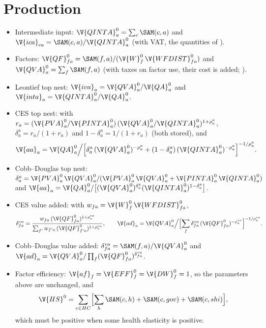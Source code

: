 \section{Production}\label{sec:cal-production}

\begin{itemize}
\item Intermediate input: $\V{QINTA}^0_a = \sum_c \SAM(c, a)$ and
$\V{ica}_{ca} = \SAM(c, a) / \V{QINTA}^0_a$ (with VAT, the quantities of
).
\item Factors: $\V{QF}^0_{fa} = \SAM(f, a) / (\V{W}^0_f\,\V{WFDIST}^0_{fa})$ and
$\V{QVA}^0_a = \sum_f \SAM(f, a)$ (with taxes on factor use, their cost is
added; ).
\item Leontief top nest: $\V{iva}_a = \V{QVA}^0_a / \V{QA}^0_a$ and
$\V{inta}_a = \V{QINTA}^0_a / \V{QA}^0_a$.
\item CES top nest: with
$r_a = (\V{PVA}^0_a / \V{PINTA}^0_a)\,(\V{QVA}^0_a / \V{QINTA}^0_a)^{1 + \rho^a_a}$,
$\delta^a_a = r_a / (1 + r_a)$ and $1 - \delta^a_a = 1/(1 + r_a)$ (both
stored), and
\begin{equation*}
\V{aa}_a = \V{QA}^0_a \Big/ \Bigl[\delta^a_a\,(\V{QVA}^0_a)^{-\rho^a_a} + (1 - \delta^a_a)\,(\V{QINTA}^0_a)^{-\rho^a_a}\Bigr]^{-1/\rho^a_a}.
\end{equation*}
\item Cobb--Douglas top nest:
$\delta^a_a = \V{PVA}^0_a\,\V{QVA}^0_a / (\V{PVA}^0_a\,\V{QVA}^0_a + \V{PINTA}^0_a\,\V{QINTA}^0_a)$
and $\V{aa}_a = \V{QA}^0_a / \bigl[(\V{QVA}^0_a)^{\delta^a_a}(\V{QINTA}^0_a)^{1 - \delta^a_a}\bigr]$.
\item CES value added: with $w_{fa} = \V{W}^0_f\,\V{WFDIST}^0_{fa}$,
\begin{equation*}
\delta^{va}_{fa} = \frac{w_{fa}\,(\V{QF}^0_{fa})^{1 + \rho^{va}_a}}{\sum_{f'} w_{f'a}\,(\V{QF}^0_{f'a})^{1 + \rho^{va}_a}},
\qquad
\V{ad}_a = \V{QVA}^0_a \Big/ \Bigl[\sum_f \delta^{va}_{fa}\,(\V{QF}^0_{fa})^{-\rho^{va}_a}\Bigr]^{-1/\rho^{va}_a}.
\end{equation*}
\item Cobb--Douglas value added: $\delta^{va}_{fa} = \SAM(f, a) / \V{QVA}^0_a$ and
$\V{ad}_a = \V{QVA}^0_a / \prod_f (\V{QF}^0_{fa})^{\delta^{va}_{fa}}$.
\item Factor efficiency: $\V{af}_f = \V{EFF}^0_f = \V{DW}^0_f = 1$, so the
parameters above are unchanged, and
\begin{equation*}
\V{HS}^0 = \sum_{c \in HC} \Bigl[\sum_h \SAM(c, h) + \SAM(c, gov) + \SAM(c, shi)\Bigr],
\end{equation*}
which must be positive when some health elasticity is positive.
\end{itemize}


